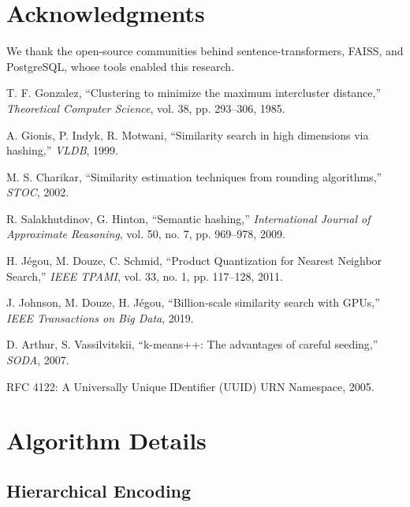 \documentclass[11pt]{article}
\begin{document}
\section*{Acknowledgments}

We thank the open-source communities behind sentence-transformers, FAISS, and PostgreSQL, whose tools enabled this research.

\begin{thebibliography}{9}

T. F. Gonzalez, ``Clustering to minimize the maximum intercluster distance,'' \emph{Theoretical Computer Science}, vol. 38, pp. 293--306, 1985.

A. Gionis, P. Indyk, R. Motwani, ``Similarity search in high dimensions via hashing,'' \emph{VLDB}, 1999.

M. S. Charikar, ``Similarity estimation techniques from rounding algorithms,'' \emph{STOC}, 2002.

R. Salakhutdinov, G. Hinton, ``Semantic hashing,'' \emph{International Journal of Approximate Reasoning}, vol. 50, no. 7, pp. 969--978, 2009.

H. Jégou, M. Douze, C. Schmid, ``Product Quantization for Nearest Neighbor Search,'' \emph{IEEE TPAMI}, vol. 33, no. 1, pp. 117--128, 2011.

J. Johnson, M. Douze, H. Jégou, ``Billion-scale similarity search with GPUs,'' \emph{IEEE Transactions on Big Data}, 2019.

D. Arthur, S. Vassilvitskii, ``k-means++: The advantages of careful seeding,'' \emph{SODA}, 2007.

RFC 4122: A Universally Unique IDentifier (UUID) URN Namespace, 2005.

\end{thebibliography}

\appendix

\section{Algorithm Details}

\subsection{Hierarchical Encoding}
\end{document}
